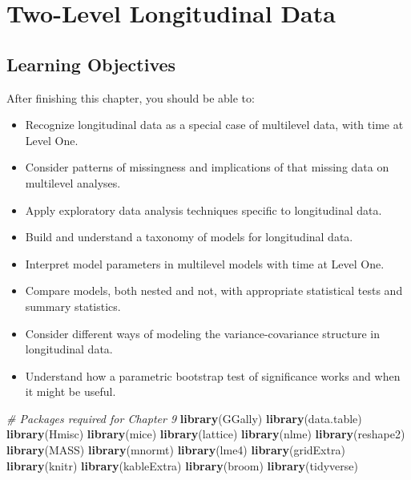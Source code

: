 \documentclass[
]{krantz}
\newenvironment{Shaded}{\begin{snugshade}}{\end{snugshade}}
\newcommand{\CommentTok}[1]{\textcolor[rgb]{0.37,0.37,0.37}{\textit{#1}}}
\newcommand{\KeywordTok}[1]{\textcolor[rgb]{0.27,0.27,0.27}{\textbf{#1}}}
\newcommand{\NormalTok}[1]{#1}
\providecommand{\tightlist}{%
  \setlength{\itemsep}{0pt}\setlength{\parskip}{0pt}}
\begin{document}
\hypertarget{ch-lon}{%
\chapter{Two-Level Longitudinal Data}\label{ch-lon}}

\hypertarget{learning-objectives-8}{%
\section{Learning Objectives}\label{learning-objectives-8}}

After finishing this chapter, you should be able to:

\begin{itemize}
\tightlist
\item
  Recognize longitudinal data as a special case of multilevel data, with time at Level One.
\item
  Consider patterns of missingness and implications of that missing data on multilevel analyses.
\item
  Apply exploratory data analysis techniques specific to longitudinal data.
\item
  Build and understand a taxonomy of models for longitudinal data.
\item
  Interpret model parameters in multilevel models with time at Level One.
\item
  Compare models, both nested and not, with appropriate statistical tests and summary statistics.
\item
  Consider different ways of modeling the variance-covariance structure in longitudinal data.
\item
  Understand how a parametric bootstrap test of significance works and when it might be useful.
\end{itemize}

\begin{Shaded}
\begin{Highlighting}[]
\CommentTok{# Packages required for Chapter 9}
\KeywordTok{library}\NormalTok{(GGally)}
\KeywordTok{library}\NormalTok{(data.table)}
\KeywordTok{library}\NormalTok{(Hmisc)}
\KeywordTok{library}\NormalTok{(mice)}
\KeywordTok{library}\NormalTok{(lattice)}
\KeywordTok{library}\NormalTok{(nlme)}
\KeywordTok{library}\NormalTok{(reshape2)}
\KeywordTok{library}\NormalTok{(MASS)}
\KeywordTok{library}\NormalTok{(mnormt)}
\KeywordTok{library}\NormalTok{(lme4)}
\KeywordTok{library}\NormalTok{(gridExtra) }
\KeywordTok{library}\NormalTok{(knitr)}
\KeywordTok{library}\NormalTok{(kableExtra)}
\KeywordTok{library}\NormalTok{(broom)}
\KeywordTok{library}\NormalTok{(tidyverse)}
\end{Highlighting}
\end{Shaded}
\end{document}
